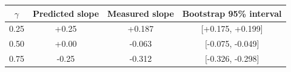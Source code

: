 \begin{tabular}{cccc}
\toprule
$\gamma$ & Predicted slope & Measured slope & Bootstrap 95\% interval \\
\midrule
0.25 & +0.25 & +0.187 & [+0.175, +0.199] \\
0.50 & +0.00 & -0.063 & [-0.075, -0.049] \\
0.75 & -0.25 & -0.312 & [-0.326, -0.298] \\
\bottomrule
\end{tabular}